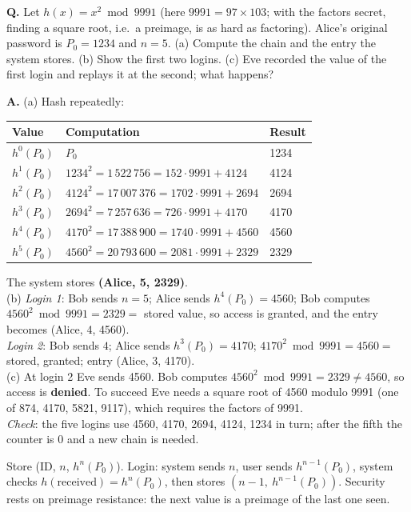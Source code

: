 \begin{worked}
\textbf{Q.} Let $h(x) = x^2 \bmod 9991$ (here $9991 = 97 \times 103$; with the factors secret, finding a square root, i.e.\ a preimage, is as hard as factoring). Alice's original password is $P_0 = 1234$ and $n = 5$. (a) Compute the chain and the entry the system stores. (b) Show the first two logins. (c) Eve recorded the value of the first login and replays it at the second; what happens?

\textbf{A.} (a) Hash repeatedly:
\begin{center}\small
\begin{tabular}{@{}lll@{}}
\toprule
Value & Computation & Result\\
\midrule
$h^0(P_0)$ & $P_0$ & 1234\\
$h^1(P_0)$ & $1234^2 = 1\,522\,756 = 152 \cdot 9991 + 4124$ & 4124\\
$h^2(P_0)$ & $4124^2 = 17\,007\,376 = 1702 \cdot 9991 + 2694$ & 2694\\
$h^3(P_0)$ & $2694^2 = 7\,257\,636 = 726 \cdot 9991 + 4170$ & 4170\\
$h^4(P_0)$ & $4170^2 = 17\,388\,900 = 1740 \cdot 9991 + 4560$ & 4560\\
$h^5(P_0)$ & $4560^2 = 20\,793\,600 = 2081 \cdot 9991 + 2329$ & 2329\\
\bottomrule
\end{tabular}
\end{center}
The system stores \textbf{(Alice, 5, 2329)}.\\
(b) \emph{Login 1}: Bob sends $n = 5$; Alice sends $h^4(P_0) = 4560$; Bob computes $4560^2 \bmod 9991 = 2329 =$ stored value, so access is granted, and the entry becomes (Alice, 4, 4560).\\
\emph{Login 2}: Bob sends $4$; Alice sends $h^3(P_0) = 4170$; $4170^2 \bmod 9991 = 4560 =$ stored, granted; entry (Alice, 3, 4170).\\
(c) At login 2 Eve sends 4560. Bob computes $4560^2 \bmod 9991 = 2329 \ne 4560$, so access is \textbf{denied}. To succeed Eve needs a square root of 4560 modulo 9991 (one of 874, 4170, 5821, 9117), which requires the factors of 9991.\\
\emph{Check}: the five logins use 4560, 4170, 2694, 4124, 1234 in turn; after the fifth the counter is 0 and a new chain is needed.
\end{worked}

\begin{mustknow}[: Lamport]
Store (ID, $n$, $h^n(P_0)$). Login: system sends $n$, user sends $h^{n-1}(P_0)$, system checks $h(\text{received}) = h^n(P_0)$, then stores $(n - 1,\ h^{n-1}(P_0))$. Security rests on preimage resistance: the next value is a preimage of the last one seen.
\end{mustknow}

